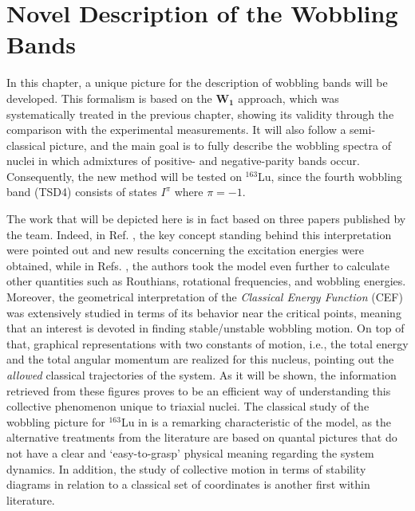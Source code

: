 \chapter{Novel Description of the Wobbling Bands}
\label{chapter-7-novel}

In this chapter, a unique picture for the description of wobbling bands will be developed. This formalism is based on the $\mathbf{W_1}$ approach, which was systematically treated in the previous chapter, showing its validity through the comparison with the experimental measurements. It will also follow a semi-classical picture, and the main goal is to fully describe the wobbling spectra of nuclei in which admixtures of positive- and negative-parity bands occur. Consequently, the new method will be tested on $^{163}$Lu, since the fourth wobbling band (TSD4) consists of states $I^\pi$ where $\pi=-1$.

The work that will be depicted here is in fact based on three papers published by the team. Indeed, in Ref. \cite{poenaru2021parity}, the key concept standing behind this interpretation were pointed out and new results concerning the excitation energies were obtained, while in Refs. \cite{poenaru2021extensive1,poenaru2021extensive2}, the authors took the model even further to calculate other quantities such as Routhians, rotational frequencies, and wobbling energies. Moreover, the geometrical interpretation of the \emph{Classical Energy Function} (CEF) was extensively studied in terms of its behavior near the critical points, meaning that an interest is devoted in finding stable/unstable wobbling motion. On top of that, graphical representations with two constants of motion, i.e., the total energy and the total angular momentum are realized for this nucleus, pointing out the \emph{allowed} classical trajectories of the system. As it will be shown, the information retrieved from these figures proves to be an efficient way of understanding this collective phenomenon unique to triaxial nuclei. The classical study of the wobbling picture for $^{163}$Lu in \cite{poenaru2021extensive2} is a remarking characteristic of the model, as the alternative treatments from the literature are based on quantal pictures that do not have a clear and `easy-to-grasp' physical meaning regarding the system dynamics. In addition, the study of collective motion in terms of stability diagrams in relation to a classical set of coordinates is another first within literature.

